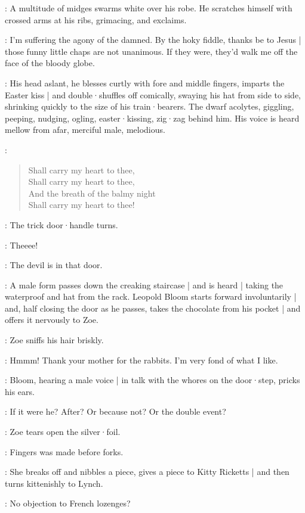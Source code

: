 :
A multitude of midges swarms white over his robe.
He scratches himself with crossed arms at his ribs,
grimacing,
and exclaims.

\Cardinal:
I'm suffering the agony of the damned.
By the hoky fiddle,
thanks be to Jesus |
those funny little chaps are not unanimous.
%
If they were,
they'd walk me off the face of the bloody globe.

:
His head aslant,
he blesses curtly with fore and middle fingers,
imparts the Easter kiss |
and double·shuffles off comically,
swaying his hat from side to side,
shrinking quickly to the size of his train·bearers.
The dwarf acolytes,
giggling,
peeping,
nudging,
ogling,
easter·kissing,
zig·zag behind him.
His voice is heard mellow from afar,
merciful male,
melodious.

\Cardinal:
\begin{verse}
    Shall carry my heart to thee,\\
    Shall carry my heart to thee,\\
%
    And the breath of the balmy night\\
    Shall carry my heart to thee!
\end{verse}

:
The trick door·handle turns.

\Doorhandle:
Theeee!

\Zoe:
The devil is in that door.

:
A male form passes down the creaking staircase |
and is heard |
taking the waterproof and hat from the rack.
Leopold Bloom starts forward involuntarily |
and,
half closing the door as he passes,
takes the chocolate from his pocket |
%
and offers it nervously to Zoe.

:
Zoe sniffs his hair briskly.

\Zoe:
Hmmm!
Thank your mother for the rabbits.
I'm very fond of what I like.

:
Bloom,
hearing a male voice |
in talk with the whores on the door·step,
pricks his ears.

\Bloom:
If it were he?
After?
Or because not?
Or the double event?

:
Zoe tears open the silver·foil.

\Zoe:
Fingers was made before forks.

:
She breaks off and nibbles a piece,
gives a piece to Kitty Ricketts |
and then turns kittenishly to Lynch.

\Zoe:
No objection to French lozenges?

